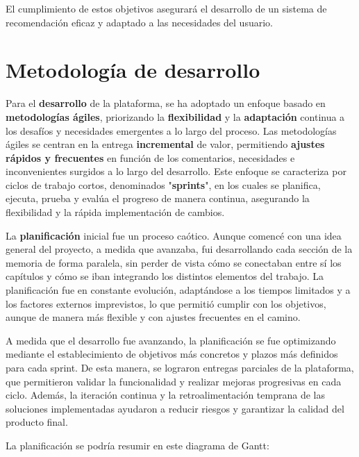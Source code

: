 El cumplimiento de estos objetivos asegurará el desarrollo de un sistema de recomendación eficaz y adaptado a las necesidades del usuario.
\newpage
\section{Metodología de desarrollo}

Para el \textbf{desarrollo} de la plataforma, se ha adoptado un enfoque basado en \textbf{metodologías ágiles}, priorizando la \textbf{flexibilidad} y la \textbf{adaptación} continua a los desafíos y necesidades emergentes a lo largo del proceso. Las metodologías ágiles se centran en la entrega \textbf{incremental} de valor, permitiendo \textbf{ajustes rápidos y frecuentes} en función de los comentarios, necesidades e inconvenientes surgidos a lo largo del desarrollo. Este enfoque se caracteriza por ciclos de trabajo cortos, denominados "\textbf{sprints}", en los cuales se planifica, ejecuta, prueba y evalúa el progreso de manera continua, asegurando la flexibilidad y la rápida implementación de cambios.

La \textbf{planificación} inicial fue un proceso caótico. Aunque comencé con una idea general del proyecto, a medida que avanzaba, fui desarrollando cada sección de la memoria de forma paralela, sin perder de vista cómo se conectaban entre sí los capítulos y cómo se iban integrando los distintos elementos del trabajo. La planificación fue en constante evolución, adaptándose a los tiempos limitados y a los factores externos imprevistos, lo que permitió cumplir con los objetivos, aunque de manera más flexible y con ajustes frecuentes en el camino.

A medida que el desarrollo fue avanzando, la planificación se fue optimizando mediante el establecimiento de objetivos más concretos y plazos más definidos para cada sprint. De esta manera, se lograron entregas parciales de la plataforma, que permitieron validar la funcionalidad y realizar mejoras progresivas en cada ciclo. Además, la iteración continua y la retroalimentación temprana de las soluciones implementadas ayudaron a reducir riesgos y garantizar la calidad del producto final.

La planificación se podría resumir en este diagrama de Gantt:

